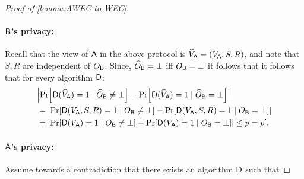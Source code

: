 \begin{proof}[Proof of \cref{lemma:AWEC-to-WEC}]
\paragraph{$\mathsf{B}$'s privacy:} Recall that the view of $\mathsf{A}$ in the above protocol is ${\widehat{V}_{\mathsf{A}}}=({V_{\mathsf{A}}},S,R)$, and note that $S,R$ are independent of $O_{\mathsf{B}}$. Since, ${\widehat{O}_{\mathsf{B}}}=\bot$ iff $O_{\mathsf{B}}=\bot$ it follows that it follows that for every algorithm $\mathsf{D}$:
    \begin{align*}
    &\size{{\pr{\Dc(\hVA) = 1 \mid \hOB \neq \bot} - \pr{\Dc(\hVA) = 1 \mid \hOB = \bot}} }\\
    &=\size{{\pr{\Dc(\VA,S,R) = 1 \mid \OB \neq \bot} - \pr{\Dc(\VA,S,R) = 1 \mid \OB = \bot}} }\\
    &=\size{\pr{\Dc(\VA) = 1 \mid \OB \neq \bot} - \pr{\Dc(\VA) = 1 \mid \OB = \bot}} \le p=p'.
    \end{align*}
\paragraph{$\mathsf{A}$’s privacy:}  Assume towards a contradiction that there exists an algorithm $\mathsf{D}$ such that


\end{proof}
